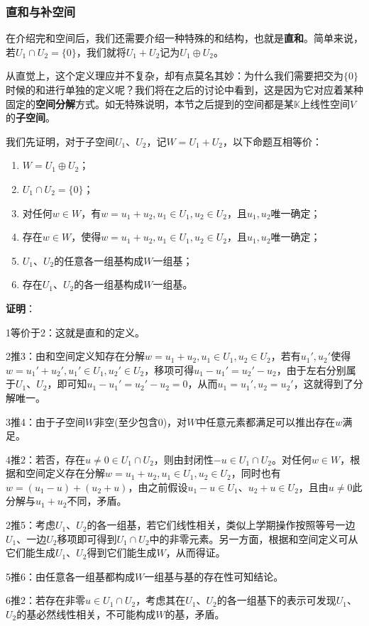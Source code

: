 \documentclass[a4paper,UTF8,fontset=windows,AutoFakeBold]{ctexart}
\newcommand{\proo}[1]{{\vspace{5pt}\kaishu\noindent\textbf{证明}：\vspace{-3pt}
\begin{compactitem}
    \item[] #1
\end{compactitem}
}}
\begin{document}
\subsubsection{直和与补空间}
在介绍完和空间后，我们还需要介绍一种特殊的和结构，也就是\textbf{直和}。简单来说，若$U_1\cap U_2=\{0\}$，我们就将$U_1+U_2$记为$U_1\oplus U_2$。

从直觉上，这个定义理应并不复杂，却有点莫名其妙：为什么我们需要把交为$\{0\}$时候的和进行单独的定义呢？我们将在之后的讨论中看到，这是因为它对应着某种固定的\textbf{空间分解}方式。如无特殊说明，本节之后提到的空间都是某$\mathbb{K}$上线性空间$V$的\textbf{子空间}。

我们先证明，对于子空间$U_1$、$U_2$，记$W=U_1+U_2$，以下命题互相等价：
\begin{enumerate}
    \item $W=U_1\oplus U_2$；
    \item $U_1\cap U_2=\{0\}$；
    \item 对任何$w\in W$，有$w=u_1+u_2,u_1\in U_1,u_2\in U_2$，且$u_1,u_2$唯一确定；
    \item 存在$w\in W$，使得$w=u_1+u_2,u_1\in U_1,u_2\in U_2$，且$u_1,u_2$唯一确定；
    \item $U_1$、$U_2$的任意各一组基构成$W$一组基；
    \item 存在$U_1$、$U_2$的各一组基构成$W$一组基。
\end{enumerate}

\proo{
    1等价于2：这就是直和的定义。

    2推3：由和空间定义知存在分解$w=u_1+u_2,u_1\in U_1,u_2\in U_2$，若有$u_1',u_2'$使得$w=u_1'+u_2',u_1'\in U_1,u_2'\in U_2$，移项可得$u_1-u_1'=u_2'-u_2$，由于左右分别属于$U_1$、$U_2$，即可知$u_1-u_1'=u_2'-u_2=0$，从而$u_1=u_1',u_2=u_2'$，这就得到了分解唯一。

    3推4：由于子空间$W$非空(至少包含0)，对$W$中任意元素都满足可以推出存在$w$满足。

    4推2：若否，存在$u\ne 0\in U_1\cap U_2$，则由封闭性$-u\in U_1\cap U_2$。对任何$w\in W$，根据和空间定义存在分解$w=u_1+u_2,u_1\in U_1,u_2\in U_2$，同时也有$w=(u_1-u)+(u_2+u)$，由之前假设$u_1-u\in U_1$、$u_2+u\in U_2$，且由$u\ne0$此分解与$u_1+u_2$不同，矛盾。

    2推5：考虑$U_1$、$U_2$的各一组基，若它们线性相关，类似上学期操作按照等号一边$U_1$、一边$U_2$移项即可得到$U_1\cap U_2$中的非零元素。另一方面，根据和空间定义可从它们能生成$U_1$、$U_2$得到它们能生成$W$，从而得证。

    5推6：由任意各一组基都构成$W$一组基与基的存在性可知结论。

    6推2：若存在非零$u\in U_1\cap U_2$，考虑其在$U_1$、$U_2$的各一组基下的表示可发现$U_1$、$U_2$的基必然线性相关，不可能构成$W$的基，矛盾。
}
\end{document}

